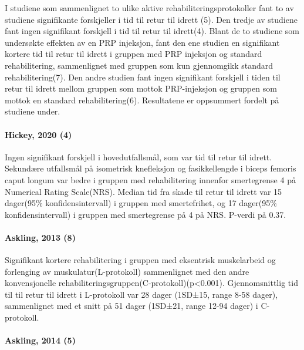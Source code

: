 \documentclass[
]{article}
\begin{document}
I studiene som sammenlignet to ulike aktive rehabiliteringsprotokoller
fant to av studiene signifikante forskjeller i tid til retur til idrett
(5). Den tredje av studiene fant ingen signifikant forskjell i tid til
retur til idrett(4). Blant de to studiene som undersøkte effekten av en
PRP injeksjon, fant den ene studien en signifikant kortere tid til retur
til idrett i gruppen med PRP injeksjon og standard rehabilitering,
sammenlignet med gruppen som kun gjennomgikk standard rehabilitering(7).
Den andre studien fant ingen signifikant forskjell i tiden til retur til
idrett mellom gruppen som mottok PRP-injeksjon og gruppen som mottok en
standard rehabilitering(6). Resultatene er oppsummert fordelt på
studiene under.

\hypertarget{hickey-2020-hickey2020}{%
\paragraph{Hickey, 2020 (4)}\label{hickey-2020-hickey2020}}

Ingen signifikant forskjell i hovedutfallsmål, som var tid til retur til
idrett. Sekundære utfallsmål på isometrisk knefleksjon og fasikkellengde
i biceps femoris caput longum var bedre i gruppen med rehabilitering
innenfor smertegrense 4 på Numerical Rating Scale(NRS). Median tid fra
skade til retur til idrett var 15 dager(95\% konfidensintervall) i
gruppen med smertefrihet, og 17 dager(95\% konfidensintervall) i gruppen
med smertegrense på 4 på NRS. P-verdi på 0.37.

\hypertarget{askling-2013-askling2013}{%
\paragraph{Askling, 2013 (8)}\label{askling-2013-askling2013}}

Signifikant kortere rehabilitering i gruppen med eksentrisk muskelarbeid
og forlenging av muskulatur(L-protokoll) sammenlignet med den andre
konvensjonelle rehabiliteringsgruppen(C-protokoll)(p\textless0.001).
Gjennomsnittlig tid til til retur til idrett i L-protokoll var 28 dager
(1SD±15, range 8-58 dager), sammenlignet med et snitt på 51 dager
(1SD±21, range 12-94 dager) i C-protokoll.

\hypertarget{askling-2014-askling2014}{%
\paragraph{Askling, 2014 (5)}\label{askling-2014-askling2014}}
\end{document}
